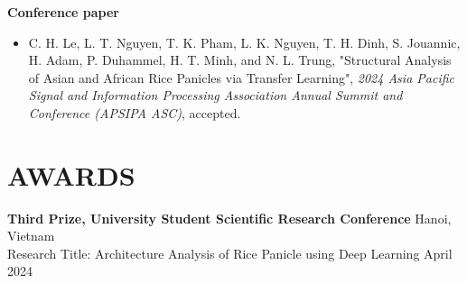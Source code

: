 \documentclass[a4paper,9pt]{extarticle}
\newcommand{\colormyname}[1]{\textcolor{myred}{#1}}
\begin{document}
\noindent
\textbf{Conference paper}
\begin{itemize}
    \item C. H. Le, \colormyname{L. T. Nguyen}, T. K. Pham, L. K. Nguyen, T. H. Dinh, S. Jouannic, H. Adam, P. Duhammel, H. T. Minh, and N. L. Trung, "Structural Analysis of Asian and African Rice Panicles via Transfer Learning", \textit{2024 Asia Pacific Signal and Information Processing Association Annual Summit and Conference (APSIPA ASC)}, accepted.
\end{itemize}

    
\section*{AWARDS}
\textbf{Third Prize, University Student Scientific Research Conference}  \hfill Hanoi, Vietnam\\ 
Research Title: Architecture Analysis of Rice Panicle using Deep Learning \hfill April 2024
\end{document}
